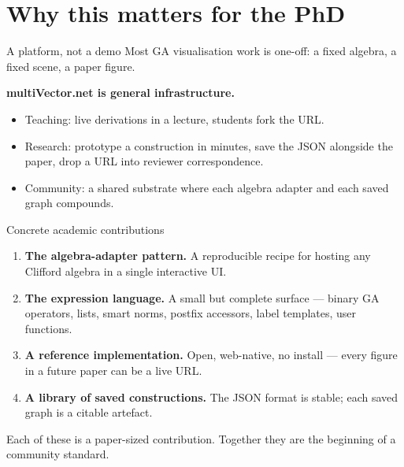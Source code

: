 \documentclass[aspectratio=169,11pt]{beamer}
\begin{document}
\section{Why this matters for the PhD}

\begin{frame}{A platform, not a demo}
  Most GA visualisation work is one-off: a fixed algebra, a fixed scene,
  a paper figure.

  \medskip
  \textbf{multiVector.net is general infrastructure.}
  \begin{itemize}
    \item Teaching: live derivations in a lecture, students fork the URL.
    \item Research: prototype a construction in minutes, save the JSON
          alongside the paper, drop a URL into reviewer correspondence.
    \item Community: a shared substrate where each algebra adapter and
          each saved graph compounds.
  \end{itemize}
\end{frame}

\begin{frame}{Concrete academic contributions}
  \begin{enumerate}
    \item \textbf{The algebra-adapter pattern.} A reproducible recipe
          for hosting any Clifford algebra in a single interactive UI.
    \item \textbf{The expression language.} A small but complete
          surface — binary GA operators, lists, smart norms, postfix
          accessors, label templates, user functions.
    \item \textbf{A reference implementation.} Open, web-native, no
          install — every figure in a future paper can be a live URL.
    \item \textbf{A library of saved constructions.} The JSON format is
          stable; each saved graph is a citable artefact.
  \end{enumerate}

  \medskip
  Each of these is a paper-sized contribution. Together they are the
  beginning of a community standard.
\end{frame}
\end{document}
